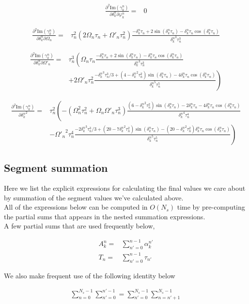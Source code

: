 \documentclass[10pt,fleqn]{article}
\newcommand{\eqar}[1]
{
  \begin{align*}
    #1
  \end{align*}
}
\newcommand{\paren}[1]{{\left({#1}\right)}}
\newcommand{\lparen}[1]{{\left({#1}\right.}}
\newcommand{\rparen}[1]{{\left.{#1}\right)}}
\begin{document}
\eqar{
  \frac{\partial^2\mathrm{Im}\paren{\gamma_k^n}}{\partial\delta_k^n\partial\varphi_k^n}=&0
}
\eqar{
  \frac{\partial^2\mathrm{Im}\paren{\gamma_k^n}}{\partial\delta_k^n\partial\Omega_n}=&\tau_n^2\paren{2\Omega_n\tau_n+\Omega'_n\tau_n^2}
  \frac{-\delta_k^n\tau_n+2\sin\paren{{\delta_k^n}\tau_n}-{\delta_k^n}\tau_n\cos\paren{{\delta_k^n}\tau_n}}{{\delta_k^n}^3\tau_n^3}
}
\eqar{
  \frac{\partial^2\mathrm{Im}\paren{\gamma_k^n}}{\partial\delta_k^n\partial\Omega'_n}=&\tau_n^3\lparen{
    \Omega_n\tau_n
    \frac{-\delta_k^n\tau_n+2\sin\paren{{\delta_k^n}\tau_n}-{\delta_k^n}\tau_n\cos\paren{{\delta_k^n}\tau_n}}{{\delta_k^n}^3\tau_n^3}
  }\\
  &\rparen{+2\Omega'_n\tau_n^2\frac{
      -{\delta_k^n}^3\tau_n^3/3
      +\paren{4-{\delta_k^n}^2\tau_n^2}\sin\paren{{\delta_k^n}\tau_n}
      -4{\delta_k^n}\tau_n\cos\paren{{\delta_k^n}\tau_n}
    }{{\delta_k^n}^5\tau_n^5}
  }
}
\eqar{
  \frac{\partial^2\mathrm{Im}\paren{\gamma_k^n}}{{\partial\delta_k^n}^2}=&\tau_n^2\lparen{
    -\paren{\Omega_n^2\tau_n^2+\Omega_n\Omega'_n\tau_n^3}
    \frac{
      \paren{6-{\delta_k^n}^2\tau_n^2}\sin\paren{{\delta_k^n}\tau_n}
      -2{\delta_k^n}\tau_n-4{\delta_k^n}\tau_n\cos\paren{{\delta_k^n}\tau_n}
    }{{\delta_k^n}^4\tau_n^4}
  }\\
  &\rparen{-{\Omega'_n}^2\tau_n^4
    \frac{
      -2{\delta_k^n}^3\tau_n^3/3
      +\paren{20-7{\delta_k^n}^2\tau_n^2}\sin\paren{{\delta_k^n}\tau_n}
      -\paren{20-{\delta_k^n}^2\tau_n^2}{\delta_k^n}\tau_n\cos\paren{{\delta_k^n}\tau_n}
    }{{\delta_k^n}^5\tau_n^5}
  }
}

\subsection{Segment summation}
Here we list the explicit expressions for calculating the final values we care about
by summation of the segment values we've calculated above.\\

All of the expressions below can be computed in $O(N_s)$ time by pre-computing
the partial sums that appears in the nested summation expressions.\\

A few partial sums that are used frequently below,
\eqar{
  A_k^n=&\sum_{n'=0}^{n-1}\!\!\alpha_k^{n'}\\
  T_n=&\sum_{n'=0}^{n-1}\!\!\tau_{n'}
}

We also make frequent use of the following identity below
\eqar{
  \sum_{n=0}^{N_s-1}\sum_{n'=0}^{n'-1}=\sum_{n'=0}^{N_s-1}\sum_{n=n'+1}^{N_s-1}
}
\end{document}
